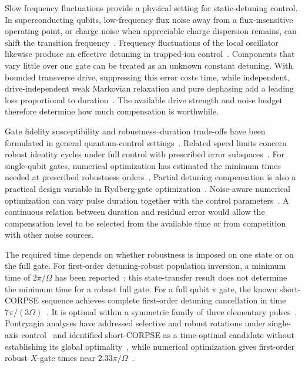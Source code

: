 \documentclass[12pt]{iopjournal}
\begin{document}
Slow frequency fluctuations provide a physical setting for
static-detuning control. In superconducting qubits, low-frequency flux
noise away from a flux-insensitive operating point, or charge noise
when appreciable charge dispersion remains, can shift the transition
frequency~\cite{krantz2019}. Frequency fluctuations of the local
oscillator likewise produce an effective detuning in trapped-ion
control~\cite{ball2016}. Components that vary little over one gate can
be treated as an unknown constant detuning. With bounded transverse
drive, suppressing this error costs time, while independent,
drive-independent weak Markovian relaxation and pure dephasing add a
leading loss proportional to duration~\cite{abad2022}. The available
drive strength and noise budget therefore determine how much
compensation is worthwhile.

Gate fidelity susceptibility and robustness--duration trade-offs have
been formulated in general quantum-control settings~\cite{poggi2024}.
Related speed limits concern robust identity cycles under full
control with prescribed error subspaces~\cite{balada2026}.
For single-qubit gates, numerical optimization has estimated the
minimum times needed at prescribed robustness orders~\cite{cao2024}.
Partial detuning compensation is also a practical design variable in
Rydberg-gate optimization~\cite{bataille2026}. Noise-aware numerical
optimization can vary pulse duration together with the control
parameters~\cite{jeon2026}. A continuous
relation between duration and residual error would allow the
compensation level to be selected from the available time or from
competition with other noise sources.

The required time depends on whether robustness is imposed on one
state or on the full gate. For first-order detuning-robust population
inversion, a minimum time of $2\pi/\Omega$ has been
reported~\cite{vandamme2017}; this state-transfer result does not
determine the minimum time for a robust full gate.
For a full qubit $\pi$ gate, the known short-CORPSE sequence achieves
complete first-order detuning cancellation in time
$7\pi/(3\Omega)$~\cite{cummins2003}. It is optimal within a symmetric
family of three elementary pulses~\cite{kukita2022}.
Pontryagin analyses have addressed selective and robust rotations
under single-axis control~\cite{ansel2021} and identified short-CORPSE as a time-optimal
candidate without establishing its global optimality~\cite{kukita2024},
while numerical optimization gives
first-order robust $X$-gate times near $2.33\pi/\Omega$~\cite{cao2024}.
\end{document}
